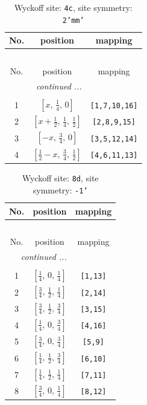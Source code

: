 \documentclass[fleqn,8pt]{jsarticle}
\begin{document}
\renewcommand{\arraystretch}{1.2}
\begin{longtable}{ccc}
\caption{Wyckoff site: {\tt 4c}, site symmetry: {\tt 2'mm'}}
 \\
 \hline \hline
No. & position & mapping \\ \hline \endfirsthead

\multicolumn{2}{l}{\tablename\ \thetable{}} \\
 \hline \hline
No. & position & mapping \\ \hline \endhead

 \hline \hline
\multicolumn{2}{r}{\footnotesize\it continued ...} \\ \endfoot

 \hline \hline
\multicolumn{2}{r}{} \\ \endlastfoot

1 & $\left[ x,\, \frac{1}{4},\, 0 \right]$ & {\tt [1,7,10,16]} \\ \hline
2 & $\left[ x + \frac{1}{2},\, \frac{1}{4},\, \frac{1}{2} \right]$ & {\tt [2,8,9,15]} \\ \hline
3 & $\left[ - x,\, \frac{3}{4},\, 0 \right]$ & {\tt [3,5,12,14]} \\ \hline
4 & $\left[ \frac{1}{2} - x,\, \frac{3}{4},\, \frac{1}{2} \right]$ & {\tt [4,6,11,13]} \\
\end{longtable}
\renewcommand{\arraystretch}{1.2}
\begin{longtable}{ccc}
\caption{Wyckoff site: {\tt 8d}, site symmetry: {\tt -1'}}
 \\
 \hline \hline
No. & position & mapping \\ \hline \endfirsthead

\multicolumn{2}{l}{\tablename\ \thetable{}} \\
 \hline \hline
No. & position & mapping \\ \hline \endhead

 \hline \hline
\multicolumn{2}{r}{\footnotesize\it continued ...} \\ \endfoot

 \hline \hline
\multicolumn{2}{r}{} \\ \endlastfoot

1 & $\left[ \frac{1}{4},\, 0,\, \frac{1}{4} \right]$ & {\tt [1,13]} \\ \hline
2 & $\left[ \frac{3}{4},\, \frac{1}{2},\, \frac{1}{4} \right]$ & {\tt [2,14]} \\ \hline
3 & $\left[ \frac{3}{4},\, \frac{1}{2},\, \frac{3}{4} \right]$ & {\tt [3,15]} \\ \hline
4 & $\left[ \frac{1}{4},\, 0,\, \frac{3}{4} \right]$ & {\tt [4,16]} \\ \hline
5 & $\left[ \frac{3}{4},\, 0,\, \frac{3}{4} \right]$ & {\tt [5,9]} \\ \hline
6 & $\left[ \frac{1}{4},\, \frac{1}{2},\, \frac{3}{4} \right]$ & {\tt [6,10]} \\ \hline
7 & $\left[ \frac{1}{4},\, \frac{1}{2},\, \frac{1}{4} \right]$ & {\tt [7,11]} \\ \hline
8 & $\left[ \frac{3}{4},\, 0,\, \frac{1}{4} \right]$ & {\tt [8,12]} \\
\end{longtable}
\end{document}
